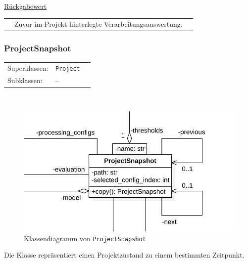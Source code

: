 \documentclass{article}
\begin{document}
\begin{itemize}
\begin{itemize}
\underline{Rückgabewert}\\
\begin{tabular}{lll}
 & Zuvor im Projekt hinterlegte Verarbeitungsauswertung.\\
\end{tabular}
\end{itemize}

\newpage
\subsubsection*{\large{\textbf{ProjectSnapshot}\label{cls:ProjectSnapshot}}}\normalsize
\begin{tabular}{lll}
 Superklassen: & \texttt{Project}\\
 Subklassen: & --
\end{tabular}\\
\begin{figure}[H]%
    \centering
    \includegraphics[width=13cm]{entwurf/Entwurf_dokument/img/cls/model/ProjectSnapshot.png}
    \caption{Klassendiagramm von \texttt{ProjectSnapshot}}
\end{figure}

Die Klasse repräsentiert einen Projektzustand zu einem bestimmten Zeitpunkt.
\\\\


\end{itemize}
\end{document}
